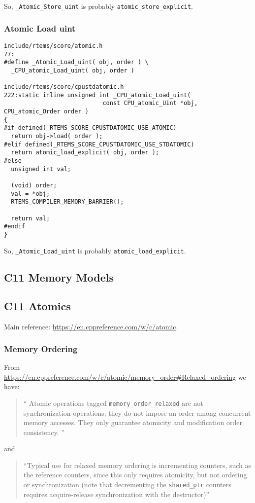 So, \verb"_Atomic_Store_uint"  is probably \verb"atomic_store_explicit".

\subsubsection{Atomic Load uint}

\begin{verbatim}
include/rtems/score/atomic.h
77:
#define _Atomic_Load_uint( obj, order ) \
  _CPU_atomic_Load_uint( obj, order )

include/rtems/score/cpustdatomic.h
222:static inline unsigned int _CPU_atomic_Load_uint(
                            const CPU_atomic_Uint *obj, CPU_atomic_Order order )
{
#if defined(_RTEMS_SCORE_CPUSTDATOMIC_USE_ATOMIC)
  return obj->load( order );
#elif defined(_RTEMS_SCORE_CPUSTDATOMIC_USE_STDATOMIC)
  return atomic_load_explicit( obj, order );
#else
  unsigned int val;

  (void) order;
  val = *obj;
  RTEMS_COMPILER_MEMORY_BARRIER();

  return val;
#endif
}
\end{verbatim}

So, \verb"_Atomic_Load_uint"  is probably \verb"atomic_load_explicit".


\newpage
\subsection{C11 Memory Models}

\newpage
\subsection{C11 Atomics}

Main reference: \url{https://en.cppreference.com/w/c/atomic}.


\subsubsection{Memory Ordering}

From \url{https://en.cppreference.com/w/c/atomic/memory_order#Relaxed_ordering}
we have:
\begin{quote}
  ``
  Atomic operations tagged \verb"memory_order_relaxed"
  are not synchronization operations;
  they do not impose an order among concurrent memory accesses.
  They only guarantee atomicity and modification order consistency.
  ''
\end{quote}
and
\begin{quote}
  ``Typical use for relaxed memory ordering is incrementing counters,
  such as the reference counters,
  since this only requires atomicity,
  but not ordering or synchronization
  (note that decrementing the \verb"shared_ptr" counters
  requires acquire-release synchronization with the destructor)''
\end{quote}

